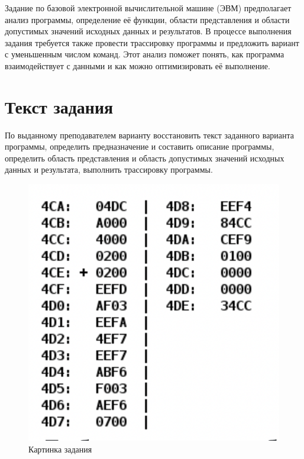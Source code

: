 \documentclass[14pt]{extreport}
\begin{document}
    \pagestyle{empty} %
    

    \pagestyle{plain} %
    \tableofcontents
    \intro Задание по базовой электронной вычислительной машине (ЭВМ) предполагает анализ программы, определение её функции, области представления и области допустимых значений исходных данных и результатов. В процессе выполнения задания требуется также провести трассировку программы и предложить вариант с уменьшенным числом команд. Этот анализ поможет понять, как программа взаимодействует с данными и как можно оптимизировать её выполнение.

    \chapter{Текст задания}
        По выданному преподавателем варианту восстановить текст заданного варианта программы, определить предназначение и составить описание программы, определить область представления и область допустимых значений исходных данных и результата, выполнить трассировку программы.

        \begin{figure}[!h]
            \centering
            \includegraphics[width=0.4\linewidth]{task.png}
            \caption{Картинка задания}

        \end{figure}
\end{document}
